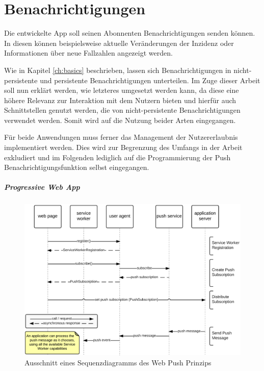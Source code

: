 \section{Benachrichtigungen}
Die entwickelte App soll seinen Abonnenten Benachrichtigungen senden können.
In diesen können beispielsweise aktuelle Veränderungen der Inzidenz oder Informationen über neue Fallzahlen angezeigt werden.

Wie in Kapitel \ref{ch:basics} beschrieben, lassen sich Benachrichtigungen in nicht-persistente und persistente Benachrichtigungen unterteilen.
Im Zuge dieser Arbeit soll nun erklärt werden, wie letzteres umgesetzt werden kann, da diese eine höhere Relevanz zur Interaktion mit dem Nutzern bieten und hierfür auch Schnittstellen genutzt werden, die von nicht-persistente Benachrichtigungen verwendet werden.
Somit wird auf die Nutzung beider Arten eingegangen.

Für beide Anwendungen muss ferner das Management der Nutzererlaubnis implementiert werden.
Dies wird zur Begrenzung des Umfangs in der Arbeit exkludiert und im Folgenden lediglich auf die Programmierung der Push Benachrichtigungsfunktion selbst eingegangen.

\subparagraph{Progressive Web App\\}
\begin{figure}[h]
 \centering
 \includegraphics[width=1\textwidth]{figures/sequence_diagram_web_push.png}
 \caption{Ausschnitt eines Sequenzdiagramms des Web Push Prinzips}
 \label{fig:structure_webpush}
\end{figure}


